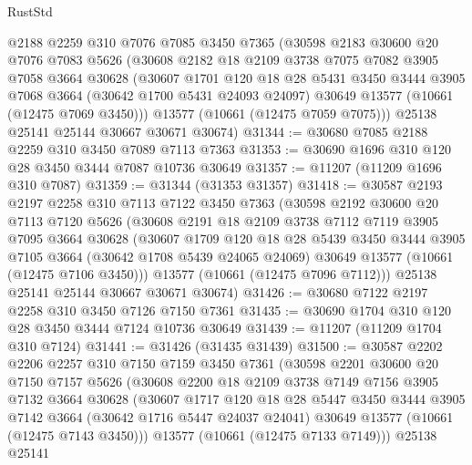 \begin{lexlean}{RustStd}
\begin{coremodule}
    @2188
    @2259
    @310
    @7076
    @7085
    @3450
    @7365
    (@30598
      @2183
      @30600
      @20
      @7076
      @7083
      @5626
      (@30608
        @2182
        @18
        @2109
        @3738
        @7075
        @7082
        @3905
        @7058
        @3664
        @30628
        (@30607
          @1701
          @120
          @18
          @28
          @5431
          @3450
          @3444
          @3905
          @7068
          @3664
          (@30642 @1700 @5431 @24093 @24097)
          @30649
          @13577
          (@10661 (@12475 @7069 @3450)))
        @13577
        (@10661 (@12475 @7059 @7075)))
      @25138
      @25141
      @25144
      @30667
      @30671
      @30674)
@31344 := @30680 @7085 @2188 @2259 @310 @3450 @7089 @7113 @7363
@31353 := @30690 @1696 @310 @120 @28 @3450 @3444 @7087 @10736 @30649
@31357 := @11207 (@11209 @1696 @310 @7087)
@31359 := @31344 (@31353 @31357)
@31418 := @30587
    @2193
    @2197
    @2258
    @310
    @7113
    @7122
    @3450
    @7363
    (@30598
      @2192
      @30600
      @20
      @7113
      @7120
      @5626
      (@30608
        @2191
        @18
        @2109
        @3738
        @7112
        @7119
        @3905
        @7095
        @3664
        @30628
        (@30607
          @1709
          @120
          @18
          @28
          @5439
          @3450
          @3444
          @3905
          @7105
          @3664
          (@30642 @1708 @5439 @24065 @24069)
          @30649
          @13577
          (@10661 (@12475 @7106 @3450)))
        @13577
        (@10661 (@12475 @7096 @7112)))
      @25138
      @25141
      @25144
      @30667
      @30671
      @30674)
@31426 := @30680 @7122 @2197 @2258 @310 @3450 @7126 @7150 @7361
@31435 := @30690 @1704 @310 @120 @28 @3450 @3444 @7124 @10736 @30649
@31439 := @11207 (@11209 @1704 @310 @7124)
@31441 := @31426 (@31435 @31439)
@31500 := @30587
    @2202
    @2206
    @2257
    @310
    @7150
    @7159
    @3450
    @7361
    (@30598
      @2201
      @30600
      @20
      @7150
      @7157
      @5626
      (@30608
        @2200
        @18
        @2109
        @3738
        @7149
        @7156
        @3905
        @7132
        @3664
        @30628
        (@30607
          @1717
          @120
          @18
          @28
          @5447
          @3450
          @3444
          @3905
          @7142
          @3664
          (@30642 @1716 @5447 @24037 @24041)
          @30649
          @13577
          (@10661 (@12475 @7143 @3450)))
        @13577
        (@10661 (@12475 @7133 @7149)))
      @25138
      @25141

\end{coremodule}
\end{lexlean}
